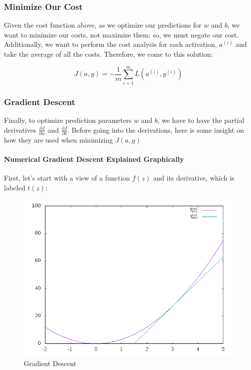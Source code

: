 \documentclass{article}
\newcommand{\myparagraph}[1]{\paragraph{#1}\mbox{}}
\begin{document}
\subsubsection{Minimize Our Cost}

Given the cost function above, as we optimize our predictions for $w$ and $b$, we want to minimize our costs, not maximize them; so, we must negate our cost.  Additionally, we want to perform the cost analysis for each activation, $a^{(i)}$ and take the average of all the costs. Therefore, we come to this solution:

$$J(a,y) = -\frac{1}{m} \sum_{i=1}^{m} L(a^{(i)},y^{(i)})$$

\subsubsection{Gradient Descent}

Finally, to optimize prediction parameters $w$ and $b$, we have to have the partial derivatives $\frac{\partial{J}}{\partial{w}}$ and $\frac{\partial{J}}{\partial{b}}$.  Before going into the derivations, here is some insight on how they are used when minimizing $J(a,y)$

\myparagraph{Numerical Gradient Descent Explained Graphically}

First, let's start with a view of a function $f(z)$ and its derivative, which is labeled $t(z)$:

\begin{figure}[H]
\includegraphics[width=\linewidth]{grad_descent.png}
\caption{Gradient Descent}
\label{fig:grad_descent}
\end{figure}
\end{document}

